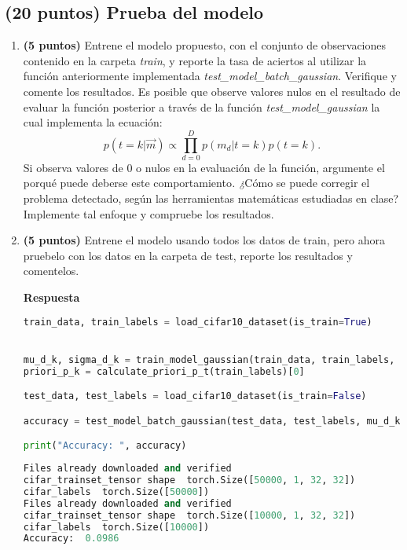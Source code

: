\documentclass[spanish]{article}
\begin{document}
\subsection{(20 puntos) Prueba del modelo}
\begin{enumerate}
\item \textbf{(5 puntos)} Entrene el modelo propuesto, con el conjunto de
observaciones contenido en la carpeta \emph{train}, y reporte la tasa
de aciertos al utilizar la función anteriormente implementada \emph{test\_model\_batch}\_\emph{gaussian}.
Verifique y comente los resultados. Es posible que observe valores
nulos en el resultado de evaluar la función posterior a través de
la función \emph{test\_model\_gaussian }la cual implementa la ecuación:\emph{
}
\[
p\left(t=k|\overrightarrow{m}\right)\propto\prod_{d=0}^{D}p\left(m_{d}|t=k\right)p\left(t=k\right).
\]
Si\emph{ }observa valores de 0 o nulos en la evaluación de la función,
argumente el porqué puede deberse este comportamiento\emph{. ¿}Cómo
se puede corregir el problema detectado, según las herramientas matemáticas
estudiadas en clase? Implemente tal enfoque y compruebe los resultados. 
\item \textbf{(5 puntos)} Entrene el modelo usando todos los datos de train,
pero ahora pruebelo con los datos en la carpeta de test, reporte los
resultados y comentelos.

\vspace{5px}
\textbf{Respuesta}
\vspace{5px}

\begin{lstlisting}[language=Python, caption=Entrenamiento sin de datos]
train_data, train_labels = load_cifar10_dataset(is_train=True)


mu_d_k, sigma_d_k = train_model_gaussian(train_data, train_labels, num_classes=10)
priori_p_k = calculate_priori_p_t(train_labels)[0]

test_data, test_labels = load_cifar10_dataset(is_train=False)

accuracy = test_model_batch_gaussian(test_data, test_labels, mu_d_k, sigma_d_k, priori_p_k)

print("Accuracy: ", accuracy)
\end{lstlisting}

\begin{lstlisting}[language=Python, caption=Salida]
Files already downloaded and verified
cifar_trainset_tensor shape  torch.Size([50000, 1, 32, 32])
cifar_labels  torch.Size([50000])
Files already downloaded and verified
cifar_trainset_tensor shape  torch.Size([10000, 1, 32, 32])
cifar_labels  torch.Size([10000])
Accuracy:  0.0986


\end{lstlisting}
\end{enumerate}
\end{document}
